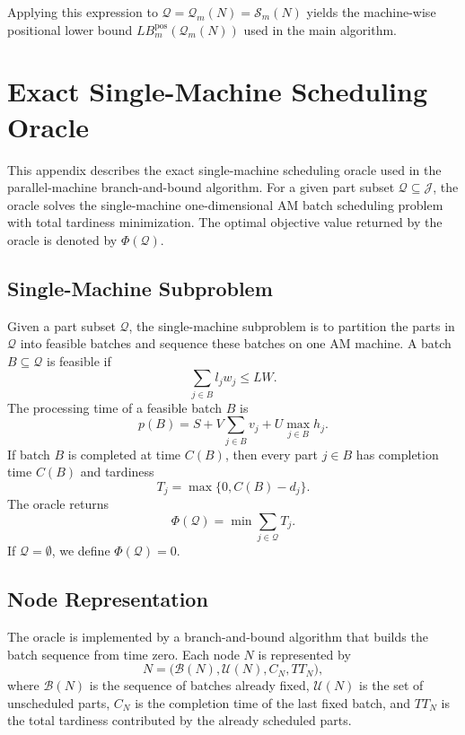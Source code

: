 \documentclass[letterpaper, 10 pt, conference]{ieeeconf}  %
\begin{document}
Applying this expression to
$\mathcal{Q}=\mathcal{Q}_m(N)=\mathcal{S}_m(N)$ yields the machine-wise
positional lower bound $LB_m^{\mathrm{pos}}(\mathcal{Q}_m(N))$ used in the
main algorithm.


\appendix
\section{Exact Single-Machine Scheduling Oracle}
\label{app:single_machine_oracle}

This appendix describes the exact single-machine scheduling oracle used in
the parallel-machine branch-and-bound algorithm. For a given part subset
$\mathcal{Q}\subseteq \mathcal{J}$, the oracle solves the single-machine
one-dimensional AM batch scheduling problem with total tardiness
minimization. The optimal objective value returned by the oracle is denoted
by $\Phi(\mathcal{Q})$.

\subsection{Single-Machine Subproblem}

Given a part subset $\mathcal{Q}$, the single-machine subproblem is to
partition the parts in $\mathcal{Q}$ into feasible batches and sequence
these batches on one AM machine. A batch $B\subseteq \mathcal{Q}$ is feasible
if
\begin{equation}
	\sum_{j\in B} l_j w_j \le LW.
\end{equation}
The processing time of a feasible batch $B$ is
\begin{equation}
	p(B)
	=
	S
	+
	V\sum_{j\in B}v_j
	+
	U\max_{j\in B}h_j .
	\label{eq:oracle_batch_processing_time}
\end{equation}
If batch $B$ is completed at time $C(B)$, then every part $j\in B$ has
completion time $C(B)$ and tardiness
\begin{equation}
	T_j=\max\{0,C(B)-d_j\}.
\end{equation}
The oracle returns
\begin{equation}
	\Phi(\mathcal{Q})
	=
	\min
	\sum_{j\in \mathcal{Q}} T_j .
\end{equation}
If $\mathcal{Q}=\emptyset$, we define $\Phi(\mathcal{Q})=0$.

\subsection{Node Representation}

The oracle is implemented by a branch-and-bound algorithm that builds the
batch sequence from time zero. Each node $N$ is represented by
\begin{equation}
	N=
	\bigl(
	\mathcal{B}(N),\mathcal{U}(N),C_N,TT_N
	\bigr),
\end{equation}
where $\mathcal{B}(N)$ is the sequence of batches already fixed,
$\mathcal{U}(N)$ is the set of unscheduled parts, $C_N$ is the completion
time of the last fixed batch, and $TT_N$ is the total tardiness contributed
by the already scheduled parts.
\end{document}
